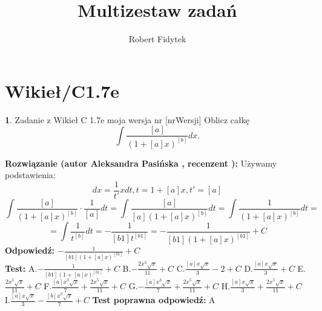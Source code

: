 \documentclass[12pt, a4paper]{article}
\title{Multizestaw zadań}
\author{Robert Fidytek}
\date{}
\theoremstyle{definition} %
\newtheorem{zad}{}
\newcommand{\kategoria}[1]{\section{#1}} %
\newcommand{\zadStart}[1]{\begin{zad}#1\newline} %
\newcommand{\zadStop}{\end{zad}}   %
\newcommand{\rozwStart}[2]{\noindent \textbf{Rozwiązanie (autor #1 , recenzent #2): }\newline} %
\newcommand{\rozwStop}{\newline}                                            %
\newcommand{\odpStart}{\noindent \textbf{Odpowiedź:}\newline}    %
\newcommand{\odpStop}{\newline}                                             %
\newcommand{\testStart}{\noindent \textbf{Test:}\newline} %
\newcommand{\testStop}{\newline} %
\newcommand{\kluczStart}{\noindent \textbf{Test poprawna odpowiedź:}\newline} %
\newcommand{\kluczStop}{\newline} %
\begin{document}
\maketitle


\kategoria{Wikieł/C1.7e}
\zadStart{Zadanie z Wikieł C 1.7e moja wersja nr [nrWersji]}
Oblicz całkę $$\int \frac{[a]}{(1+[a]x)^{[b]}}dx.$$
\zadStop
\rozwStart{Aleksandra Pasińska}{}
Używamy podstawienia:
$$dx=\frac{1}{t'}xdt,t=1+[a]x, t'=[a]$$
$$\int \frac{[a]}{(1+[a]x)^{[b]}}\cdot \frac{1}{[a]}dt=\int \frac{[a]}{[a](1+[a]x)^{[b]}}dt=\int \frac{1}{(1+[a]x)^{[b]}}dt=$$
$$=\int \frac{1}{t^{[b]}}dt=-\frac{1}{[b1]t^{[b1]}}=-\frac{1}{[b1](1+[a]x)^{[b1]}}+C$$
\rozwStop
\odpStart
$-\frac{1}{[b1](1+[a]x)^{[b1]}}+C$\\
\odpStop
\testStart
A.$-\frac{1}{[b1](1+[a]x)^{[b1]}}+C$
B.$-\frac{2x^5\sqrt{x}}{11}+C$
C.$\frac{[a]x\sqrt{x}}{3}-2+C$
D.$\frac{[a]x\sqrt{x}}{3}+C$
E.$\frac{2x^5\sqrt{x}}{11}+C$
F.$\frac{[a]x^3\sqrt{x}}{7}+\frac{2x^5\sqrt{x}}{11}+C$
G.$-\frac{[a]x^3\sqrt{x}}{7}+\frac{2x^5\sqrt{x}}{11}+C$
H.$\frac{[a]x\sqrt{x}}{3}+\frac{2x^5\sqrt{x}}{11}+C$
I.$\frac{[a]x\sqrt{x}}{3}-\frac{[b]x^3\sqrt{x}}{7}+C$
\testStop
\kluczStart
A
\kluczStop
\end{document}
